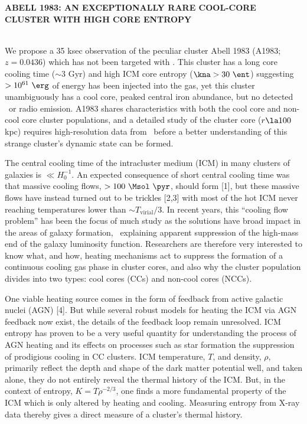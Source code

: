 \documentclass[letterpaper,11pt,twocolumn]{article}
\begin{document}
\pagestyle{plain}

\begin{center}
\bfseries\uppercase{Abell 1983: An Exceptionally Rare Cool-Core
  Cluster with High Core Entropy}
\end{center}
\\
We propose a 35 ksec observation of the peculiar cluster Abell 1983
(A1983; $z=0.0436$) which has not been targeted with \chandra. This
cluster has a long core cooling time ($\sim 3$ Gyr) and high ICM core
entropy ($\kna > 30~\ent$) suggesting $> 10^{61}~\erg$ of energy has
been injected into the gas, yet this cluster unambiguously has a cool
core, peaked central iron abundance, but no detected \halpha\ or radio
emission. A1983 shares characteristics with both the cool core and
non-cool core cluster populations, and a detailed study of the cluster
core ($r \la 100$ kpc) requires high-resolution data from
\chandra\ before a better understanding of this strange cluster's
dynamic state can be formed.

The central cooling time of the intracluster medium (ICM) in many
clusters of galaxies is $\ll H_0^{-1}$. An expected consequence of
short central cooling time was that massive cooling flows, $> 100
~\Msol~\pyr$, should form [1], but these massive flows have instead
turned out to be trickles [2,3] with most of the hot ICM never
reaching temperatures lower than $\sim T_{\mathrm{virial}}/3$. In
recent years, this ``cooling flow problem'' has been the focus of much
study as the solutions have broad impact in the areas of galaxy
formation, \eg\ explaining apparent suppression of the high-mass end
of the galaxy luminosity function. Researchers are therefore very
interested to know what, and how, heating mechanisms act to suppress
the formation of a continuous cooling gas phase in cluster cores, and
also why the cluster population divides into two types: cool cores
(CCs) and non-cool cores (NCCs).

One viable heating source comes in the form of feedback from active
galactic nuclei (AGN) [4]. But while several robust models for heating
the ICM via AGN feedback now exist, the details of the feedback loop
remain unresolved. ICM entropy has proven to be a very useful quantity
for understanding the process of AGN heating and its effects on
processes such as star formation the suppression of prodigious cooling
in CC clusters. ICM temperature, $T$, and density, $\rho$, primarily
reflect the depth and shape of the dark matter potential well, and
taken alone, they do not entirely reveal the thermal history of the
ICM. But, in the context of entropy, $K = T\rho^{-2/3}$, one finds a
more fundamental property of the ICM which is only altered by heating
and cooling. Measuring entropy from X-ray data thereby gives a direct
measure of a cluster's thermal history.
\end{document}
